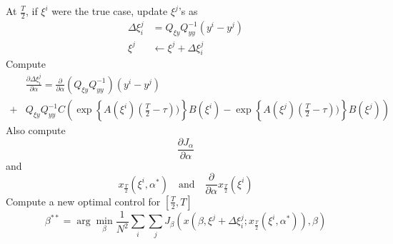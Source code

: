 \documentclass[a4paper,onecolumn]{article}
\begin{document}
At $\frac{T}{2}$, if $\xi^i$ were the true case, update $\xi^j$'s as
\begin{equation}\begin{split}
    \Delta \xi^j_i &= Q_{\xi y} Q^{-1}_{yy}\left(y^i - y^j\right)\\
	\xi^j &\leftarrow \xi^j + \Delta \xi^j_i
\end{split}\end{equation}
Compute
\begin{equation}\begin{split}
    &\frac{\partial \Delta \xi_i^j}{\partial \alpha} =
	\frac{\partial}{\partial \alpha} \left(Q_{\xi y}Q_{yy}^{-1}\right)
	(y^i-y^j) \\+ &Q_{\xi y}Q_{yy}^{-1} C
	\left(
	\exp\left\{A(\xi^i)(\frac{T}{2}-\tau))\right\}B(\xi^i) -
	\exp\left\{A(\xi^j)(\frac{T}{2}-\tau))\right\}B(\xi^j)
	\right)
\end{split}\end{equation}
Also compute
\begin{equation}
       \frac{\partial J_\alpha}{\partial \alpha}
\end{equation}
and
\begin{equation}
    x_{\frac{T}{2}}(\xi^i, \alpha^*)\quad\textrm{and}\quad 
    \frac{\partial}{\partial \alpha} x_{\frac{T}{2}}(\xi^i)
\end{equation}
Compute a new optimal control for $[\frac{T}{2},T]$
\begin{equation}
    \beta^{**} = \arg\min_\beta \frac{1}{N^2}\sum_{i}\sum_j J_\beta
	\left(
	x(\beta,\xi^j+\Delta \xi^j_i; x_{\frac{T}{2}}(\xi^i, \alpha^*)),
	\beta
	\right)
\end{equation}
\end{document}
